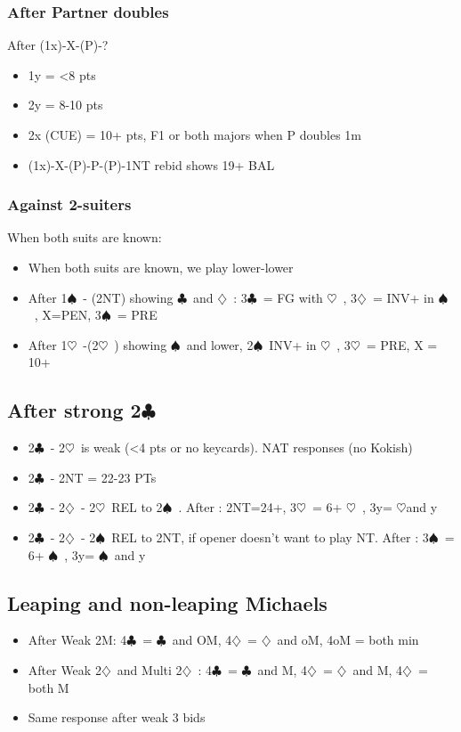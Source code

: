 \documentclass{article}
\newcommand\C{\ensuremath{\clubsuit}}
\newcommand\D{\ensuremath{\diamondsuit}}
\renewcommand\H{\ensuremath{\heartsuit}}
\renewcommand\S{\ensuremath{\spadesuit}}
\begin{document}
\begin{multicols}{2}
  \subsubsection{After Partner doubles}
  After (1x)-X-(P)-?
  \begin{itemize}
    \item 1y = <8 pts
    \item 2y = 8-10 pts
    \item 2x (CUE) = 10+ pts, F1 or both majors when P doubles 1m
     \item (1x)-X-(P)-P-(P)-1NT rebid shows 19+ BAL
  \end{itemize}
  \subsubsection{Against 2-suiters}
  \label{twosdefence}
  When both suits are known:
  \begin{itemize}
    \item When both suits are known, we play lower-lower
    \item After 1\S\ - (2NT) showing \C\ and \D\ : 3\C\ = FG with \H\ , 3\D\ = INV+ in \S\ , X=PEN, 3\S\ = PRE
    \item After 1\H\ -(2\H\ ) showing \S\ and lower, 2\S\ INV+ in \H\ , 3\H\ = PRE, X = 10+ 
    \end{itemize}
\end{multicols}

 \subsection{After strong 2\C\ }
 \label{kokish}
 \begin{itemize}
   \item 2\C\ - 2\H\ is weak (<4 pts or no keycards). NAT responses (no Kokish)
   \item 2\C\ - 2NT = 22-23 PTs
   \item 2\C\ - 2\D\ - 2\H\ REL to 2\S\ .  After : 2NT=24+, 3\H\ = 6+ \H\ , 3y= \H and y
   \item 2\C\ - 2\D\ - 2\S\ REL to 2NT, if opener doesn't want to play NT. After :  3\S\ = 6+ \S\ , 3y= \S\ and y
   \end{itemize}
 \subsection{Leaping and non-leaping Michaels }
 \label{leaping}
 \begin{itemize}
   \item After Weak 2M: 4\C\ = \C\ and OM, 4\D\ = \D\ and oM, 4oM = both min
   \item After Weak 2\D\ and Multi 2\D\ : 4\C\ = \C\ and M, 4\D\ = \D\ and M, 4\D\ = both M
   \item  Same response after weak 3 bids
 \end{itemize}
\end{document}
